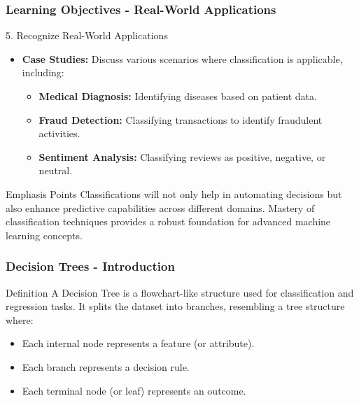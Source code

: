 \documentclass[aspectratio=169]{beamer}
\begin{document}
\begin{frame}[fragile]
    \frametitle{Learning Objectives - Real-World Applications}
    \begin{block}{5. Recognize Real-World Applications}
        \begin{itemize}
            \item \textbf{Case Studies:} Discuss various scenarios where classification is applicable, including:
            \begin{itemize}
                \item \textbf{Medical Diagnosis:} Identifying diseases based on patient data.
                \item \textbf{Fraud Detection:} Classifying transactions to identify fraudulent activities.
                \item \textbf{Sentiment Analysis:} Classifying reviews as positive, negative, or neutral.
            \end{itemize}
        \end{itemize}
    \end{block}

    \begin{block}{Emphasis Points}
        Classifications will not only help in automating decisions but also enhance predictive capabilities across different domains. Mastery of classification techniques provides a robust foundation for advanced machine learning concepts.
    \end{block}
\end{frame}

\begin{frame}[fragile]
    \frametitle{Decision Trees - Introduction}
    \begin{block}{Definition}
        A Decision Tree is a flowchart-like structure used for classification and regression tasks. 
        It splits the dataset into branches, resembling a tree structure where:
        \begin{itemize}
            \item Each internal node represents a feature (or attribute).
            \item Each branch represents a decision rule.
            \item Each terminal node (or leaf) represents an outcome.
        \end{itemize}
    \end{block}
\end{frame}
\end{document}
